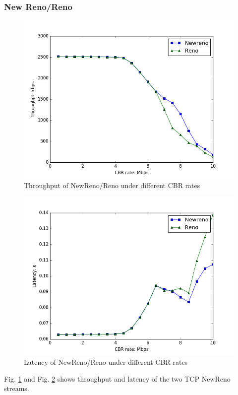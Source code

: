 \documentclass[10pt, conference]{IEEEtran/IEEEtran}
\begin{document}
\subsubsection{New Reno/Reno}
\begin{figure}[!ht]
\begin{center}
\includegraphics[width=\linewidth]{../exp2/exp2_Newreno_Reno_thpt.png}
\caption{Throughput of NewReno/Reno under different CBR rates}
\label{exp2_NewReno_Reno_thpt}
\end{center}
\end{figure}
\begin{figure}[!ht]
\begin{center}
\includegraphics[width=\linewidth]{../exp2/exp2_Newreno_Reno_lat.png}
\caption{Latency of NewReno/Reno under different CBR rates}
\label{exp2_NewReno_Reno_lat}
\end{center}
\end{figure}
Fig. \ref{exp2_NewReno_Reno_thpt} and Fig. \ref{exp2_NewReno_Reno_lat} shows throughput and latency of the two TCP NewReno streams. 
\end{document}
